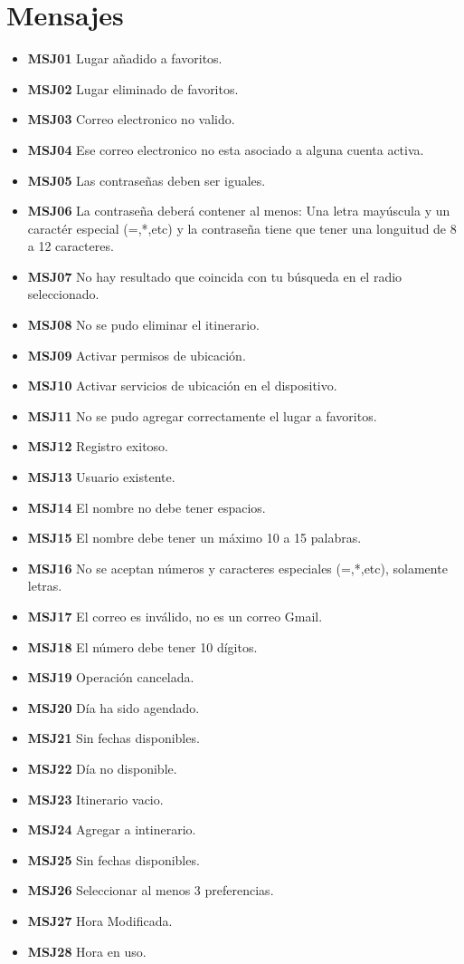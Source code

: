 \documentclass{article}
\begin{document}
\section{Mensajes}
\begin{itemize}
    \item \textbf{MSJ01} Lugar añadido a favoritos.
    \item \textbf{MSJ02} Lugar eliminado de favoritos.
    \item \textbf{MSJ03} Correo electronico no valido.
    \item \textbf{MSJ04} Ese correo electronico no esta asociado a alguna     cuenta activa.
    \item \textbf{MSJ05} Las contraseñas deben ser iguales.
    \item \textbf{MSJ06} La contraseña deberá contener al menos: Una letra mayúscula y un caractér especial (=,*,etc) y la contraseña tiene que tener una longuitud de 8 a 12 caracteres.
    \item \textbf{MSJ07} No hay resultado que coincida con tu búsqueda en el radio seleccionado.
    \item \textbf{MSJ08} No se pudo eliminar el itinerario.
    \item \textbf{MSJ09} Activar permisos de ubicación.
    \item \textbf{MSJ10} Activar servicios de ubicación en el dispositivo.
    \item \textbf{MSJ11} No se pudo agregar correctamente el lugar a favoritos.
    \item \textbf{MSJ12} Registro exitoso.
    \item \textbf{MSJ13} Usuario existente.
    \item \textbf{MSJ14} El nombre no debe tener espacios.
    \item \textbf{MSJ15} El nombre debe tener un máximo 10 a 15 palabras.
    \item \textbf{MSJ16} No se aceptan números y caracteres especiales (=,*,etc), solamente letras.
    \item \textbf{MSJ17} El correo es inválido, no es un correo Gmail.
    \item \textbf{MSJ18} El número debe tener 10 dígitos.
    \item \textbf{MSJ19} Operación cancelada.
    \item \textbf{MSJ20} Día ha sido agendado.
    \item \textbf{MSJ21} Sin fechas disponibles.
    \item \textbf{MSJ22} Día no disponible.
    \item \textbf{MSJ23} Itinerario vacio.
    \item \textbf{MSJ24} Agregar a intinerario.
    \item \textbf{MSJ25} Sin fechas disponibles.
    \item \textbf{MSJ26} Seleccionar al menos 3 preferencias.
    \item \textbf{MSJ27} Hora Modificada.
    \item \textbf{MSJ28} Hora en uso.
    
\end{itemize}
\end{document}
